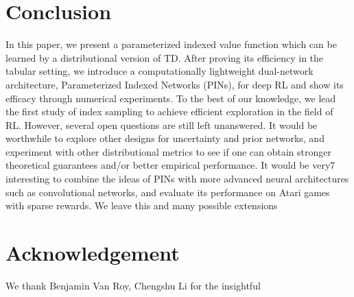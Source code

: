 \documentclass[letterpaper]{article} %
\theoremstyle{definition}
\begin{document}
\vspace{-3.59mm}
\section{Conclusion}

In this paper, we present a parameterized indexed value function which can be learned by a distributional version of TD. After proving its efficiency in the tabular setting, we introduce a computationally lightweight dual-network architecture, Parameterized Indexed Networks (PINs), for deep RL and show its efficacy through numerical experiments. To the best of our knowledge, we lead the first study of index sampling to achieve efficient exploration in the field of RL.  However, several open questions are still left unanswered. It would be worthwhile to explore other designs for uncertainty and prior networks, and experiment with other distributional metrics to see if one can obtain stronger theoretical guarantees and/or better empirical performance. It would be very7 interesting to combine the ideas of PINs with more advanced neural architectures such as convolutional networks, and evaluate its performance on Atari games with sparse rewards. We leave this and many possible extensions

\vspace{-3.23mm}
\section{Acknowledgement}
We thank Benjamin Van Roy, Chengshu Li for the insightful

\medskip

\clearpage


\end{document}
